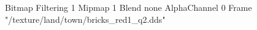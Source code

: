 {Bitmap
	{Filtering 1}
	{Mipmap 1}
	{Blend none}
	{AlphaChannel 0}
	{Frame "/texture/land/town/bricks_red1_q2.dds"}
}
